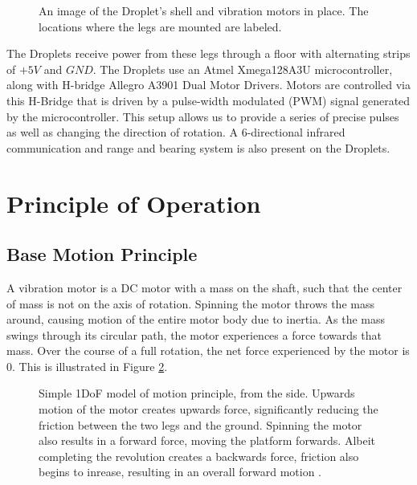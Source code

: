 \documentclass[letterpaper, 10pt, conference]{ieeeconf}
\begin{document}
\begin{figure}[!htb]
	\centering
	
	\caption{An image of the Droplet's shell and vibration motors in place. The locations where the legs are mounted are labeled.}
	\label{fig:PWMs}
\end{figure}

The Droplets receive power from these legs through a floor with alternating strips of $+5V$ and $GND$. The Droplets use an Atmel Xmega128A3U microcontroller, along with H-bridge Allegro A3901 Dual Motor Drivers. Motors are controlled via this H-Bridge that is driven by a pulse-width modulated (PWM) signal generated by the microcontroller. This setup allows us to provide a series of precise pulses as well as changing the direction of rotation. A 6-directional infrared communication and range and bearing system \cite{farrow14} is also present on the Droplets.


\section{Principle of Operation}

\subsection{Base Motion Principle}
A vibration motor is a DC motor with a mass on the shaft, such that the center of mass is not on the axis of rotation. Spinning the motor throws the mass around, causing motion of the entire motor body due to inertia. As the mass swings through its circular path, the motor experiences a force towards that mass. Over the course of a full rotation, the net force experienced by the motor is 0. This is illustrated in Figure \ref{motorDiagram}.

\begin{figure}[!htb]
\centering

\caption{Simple 1DoF model of motion principle, from the side. Upwards motion of the motor creates upwards force, significantly reducing the friction between the two legs and the ground. Spinning the motor also results in a forward force, moving the platform forwards. Albeit completing the revolution creates a backwards force, friction also begins to inrease, resulting in an overall forward motion \cite{Vartholomeos2005}.}
\label{motorDiagram}
\end{figure}
\end{document}
